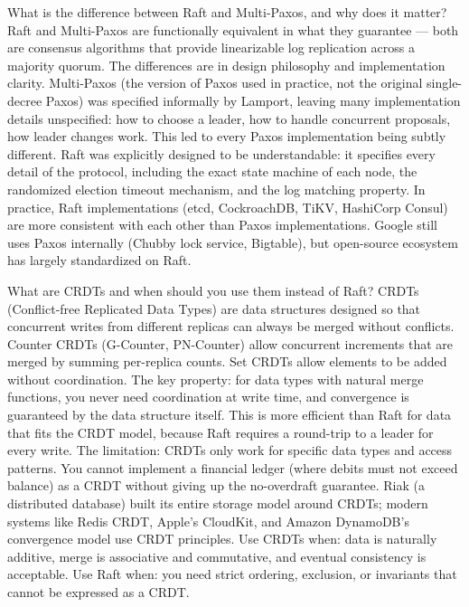 \documentclass[11pt,a4paper]{article}
\begin{document}
\begin{curiobox}{What is the difference between Raft and Multi-Paxos, and why does it matter?}
Raft and Multi-Paxos are functionally equivalent in what they guarantee --- both are consensus algorithms that provide linearizable log replication across a majority quorum. The differences are in design philosophy and implementation clarity. Multi-Paxos (the version of Paxos used in practice, not the original single-decree Paxos) was specified informally by Lamport, leaving many implementation details unspecified: how to choose a leader, how to handle concurrent proposals, how leader changes work. This led to every Paxos implementation being subtly different. Raft was explicitly designed to be understandable: it specifies every detail of the protocol, including the exact state machine of each node, the randomized election timeout mechanism, and the log matching property. In practice, Raft implementations (etcd, CockroachDB, TiKV, HashiCorp Consul) are more consistent with each other than Paxos implementations. Google still uses Paxos internally (Chubby lock service, Bigtable), but open-source ecosystem has largely standardized on Raft.
\end{curiobox}

\begin{curiobox}{What are CRDTs and when should you use them instead of Raft?}
CRDTs (Conflict-free Replicated Data Types) are data structures designed so that concurrent writes from different replicas can always be merged without conflicts. Counter CRDTs (G-Counter, PN-Counter) allow concurrent increments that are merged by summing per-replica counts. Set CRDTs allow elements to be added without coordination. The key property: for data types with natural merge functions, you never need coordination at write time, and convergence is guaranteed by the data structure itself. This is more efficient than Raft for data that fits the CRDT model, because Raft requires a round-trip to a leader for every write. The limitation: CRDTs only work for specific data types and access patterns. You cannot implement a financial ledger (where debits must not exceed balance) as a CRDT without giving up the no-overdraft guarantee. Riak (a distributed database) built its entire storage model around CRDTs; modern systems like Redis CRDT, Apple's CloudKit, and Amazon DynamoDB's convergence model use CRDT principles. Use CRDTs when: data is naturally additive, merge is associative and commutative, and eventual consistency is acceptable. Use Raft when: you need strict ordering, exclusion, or invariants that cannot be expressed as a CRDT.
\end{curiobox}
\end{document}
